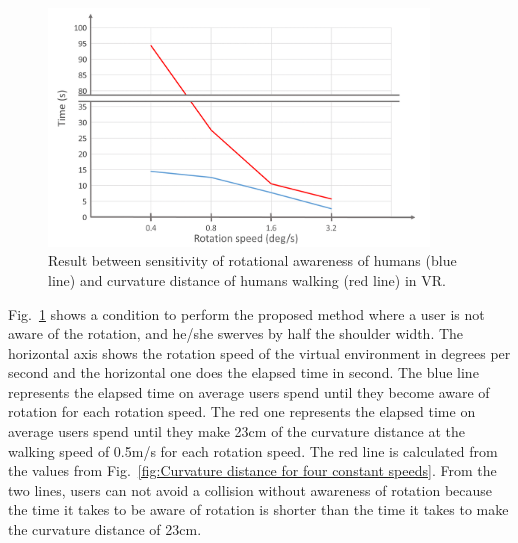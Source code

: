 \begin{figure}[H]\centering
	\includegraphics[width=0.9\textwidth]{Pictures/edit.png}%
	\caption{Result between sensitivity of rotational awareness of humans (blue line) and curvature distance of humans walking (red line) in VR.}\label{fig:Exp2_Conclude}%
	
\end{figure}

Fig.~\ref{fig:Exp2_Conclude} shows a condition to perform the proposed method where a user is not aware of the rotation, and he/she swerves by half the shoulder width. The horizontal axis shows the rotation speed of the virtual environment in degrees per second and the horizontal one does the elapsed time in second. The blue line represents the elapsed time on average users spend until they become aware of rotation for each rotation speed. The red one represents the elapsed time on average users spend until they make 23cm of the curvature distance at the walking speed of 0.5m/s for each rotation speed. The red line is calculated from the values from Fig.~\ref{fig:Curvature distance for four constant speeds}. From the two lines, users can not avoid a collision without awareness of rotation because the time it takes to be aware of rotation is shorter than the time it takes to make the curvature distance of 23cm.

